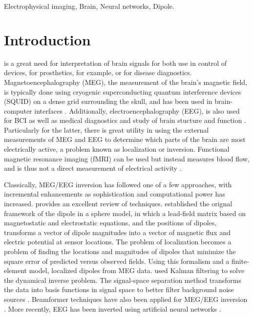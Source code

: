 \documentclass[journal]{IEEEtran}
\begin{document}
\begin{IEEEkeywords}
Electrophysical imaging, Brain, Neural networks, Dipole.
\end{IEEEkeywords}



\IEEEpeerreviewmaketitle



\section{Introduction}

 is a great need for interpretation of brain signals for both use in control of devices, for prosthetics, for example, or for disease diagnostics. Magnetoencephalography (MEG), the measurement of the brain's magnetic field, is typically done using cryogenic superconducting quantum interference devices (SQUID) on a dense grid surrounding the skull, and has been used in brain-computer interfaces \cite{mellinger2007meg}. Additionally, electroencephalography (EEG), is also used for BCI as well as medical diagnostics and study of brain stucture and function \cite{da2008impact}. Particularly for the latter, there is great utility in using the external measurements of MEG and EEG to determine which parts of the brain are most electrically active, a problem known as localization or inversion. Functional magnetic resonance imaging (fMRI) can be used but instead measures blood flow, and is thus not a direct measurement of electrical activity \cite{sharon2007advantage}.


Classically, MEG/EEG inversion has followed one of a few approaches, with incremental enhancements as sophistication and computational power has increased. \cite{grech2008review} provides an excellent review of techniques. \cite{mosher1992multiple} established the orignal framework of the dipole in a sphere model, in which a lead-field matrix based on magnetostatic and electrostatic equations, and the positions of dipoles, transforms a vector of dipole magnitudes into a vector of magnetic flux and electric potential at sensor locations. The problem of localization becomes a problem of finding the locations and magnitudes of dipoles that minimize the square error of predicted versus observed fields. Using this formalism and a finite-element model, \cite{buchner1997inverse} localized dipoles from MEG data. \cite{galka2004solution} used Kalman filtering to solve the dynamical inverse problem. The signal-space separation method transforms the data into basis functions in signal space to better filter background noise sources \cite{taulu2005applications}. Beamformer techniques have also been applied for MEG/EEG inversion \cite{sekihara2001reconstructing}. More recently, EEG has been inverted using artificial neural networks \cite{van2000eeg}.
\end{document}
